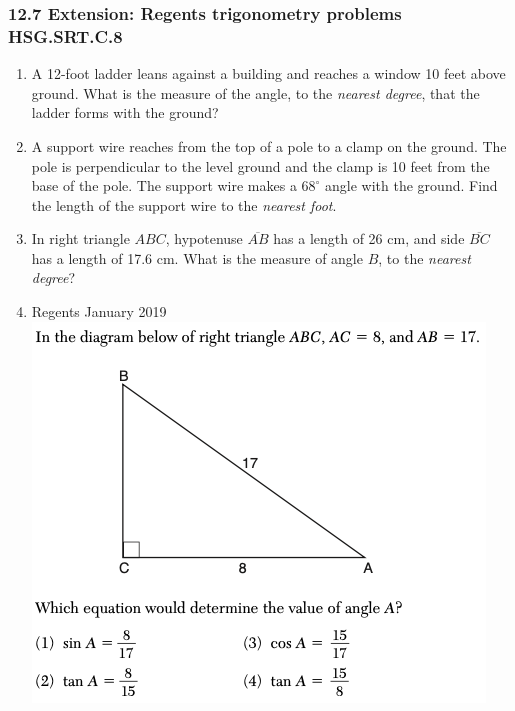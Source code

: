

\fancyhead[LE]{\thepage}



\subsubsection*{12.7 Extension: Regents trigonometry problems \hfill HSG.SRT.C.8}
\begin{enumerate}
  \subsubsection*{Start by sketching the situation for each problem}

\item A 12-foot ladder leans against a building and reaches a window 10 feet above ground. What is the measure of the angle, to the \emph{nearest degree}, that the ladder forms with the ground? \vspace{5cm}

\item A support wire reaches from the top of a pole to a clamp on the ground. The pole is perpendicular to the level ground and the clamp is 10 feet from the base of the pole. The support wire makes a $68^\circ$ angle with the ground. Find the length of the support wire to the \emph{nearest foot}. \vspace{6cm}

\item In right triangle $ABC$, hypotenuse $\overline{AB}$ has a length of 26 cm, and side $\overline{BC}$ has a length of 17.6 cm. What is the measure of angle $B$, to the \emph{nearest degree}?

\newpage
\item Regents January 2019\\
 \includegraphics[scale=0.65]{../graphics/Pyth+trig_17_Jan2019.png}


\end{enumerate}
